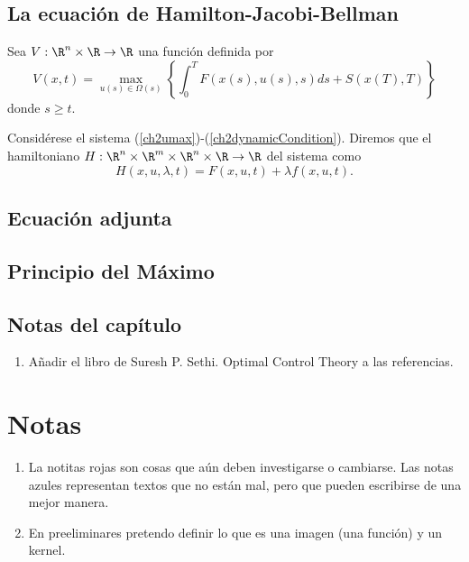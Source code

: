     \section{La ecuación de Hamilton-Jacobi-Bellman}
    Sea $V: \R^n \times \R \to \R$ una función definida por
    \begin{equation}
        V(x,t) = \max_{u(s)\in \Omega(s)}\left\{\int_0^T F(x(s), u(s), s)ds + S(x(T), T)\right\}
    \end{equation}
    donde $s \geq t$.
    \begin{definition}
        Considérese el sistema (\ref{ch2umax})-(\ref{ch2dynamicCondition}). Diremos que el hamiltoniano $H: \R^n\times \R^m \times \R^n \times \R \to \R$ del sistema como 
        \begin{equation}
            H(x,u,\lambda, t) = F(x,u,t) + \lambda f(x,u,t).
        \end{equation}
    \end{definition}
    \section{Ecuación adjunta}
    \section{Principio del Máximo}
    \section{Notas del capítulo}
    \begin{enumerate}
        \item Añadir el libro de Suresh P. Sethi. Optimal Control Theory a las referencias.
    \end{enumerate}

    \chapter{Notas}
    \begin{enumerate}
        \item La notitas rojas son cosas que aún deben investigarse o cambiarse. Las notas azules representan textos que no están mal, pero que pueden escribirse de una mejor manera.
        \item En preeliminares pretendo definir lo que es una imagen (una función) y un kernel.
    \end{enumerate}
